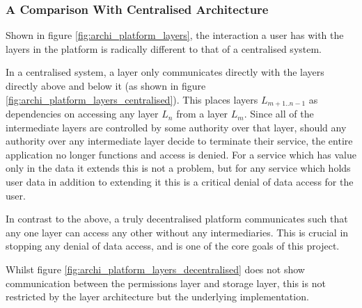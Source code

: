 \subsubsection{A Comparison With Centralised Architecture}

Shown in figure \ref{fig:archi_platform_layers}, the interaction a user has with the layers in the platform is radically different to that of a centralised system.

In a centralised system, a layer only communicates directly with the layers directly above and below it (as shown in figure \ref{fig:archi_platform_layers_centralised}). This places layers $L_{m+1..n-1}$ as dependencies on accessing any layer $L_{n}$ from a layer $L_{m}$. Since all of the intermediate layers are controlled by some authority over that layer, should any authority over any intermediate layer decide to terminate their service, the entire application no longer functions and access is denied. For a service which has value only in the data it extends this is not a problem, but for any service which holds user data in addition to extending it this is a critical denial of data access for the user. 



In contrast to the above, a truly decentralised platform communicates such that any one layer can access any other without any intermediaries. This is crucial in stopping any denial of data access, and is one of the core goals of this project.



Whilst figure \ref{fig:archi_platform_layers_decentralised} does not show communication between the permissions layer and storage layer, this is not restricted by the layer architecture but the underlying implementation.
